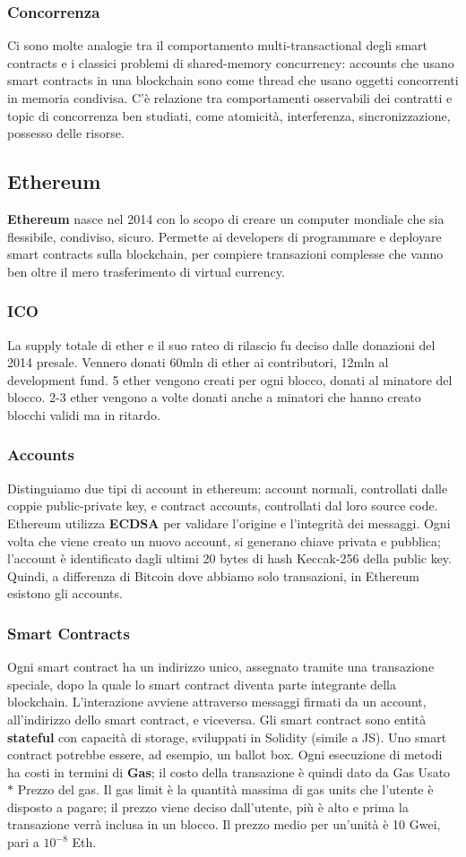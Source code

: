 \documentclass[11pt]{article}
\begin{document}
\subsubsection{Concorrenza}
Ci sono molte analogie tra il comportamento multi-transactional degli smart contracts e i classici problemi di shared-memory concurrency: accounts che usano smart contracts in una blockchain sono come thread che usano oggetti concorrenti in memoria condivisa. C'è relazione tra comportamenti osservabili dei contratti e topic di concorrenza ben studiati, come atomicità, interferenza, sincronizzazione, possesso delle risorse.

\subsection{Ethereum}
\textbf{Ethereum} nasce nel 2014 con lo scopo di creare un computer mondiale che sia flessibile, condiviso, sicuro. Permette ai developers di programmare e deployare smart contracts sulla blockchain, per compiere transazioni complesse che vanno ben oltre il mero trasferimento di virtual currency. 
\subsubsection{ICO} La supply totale di ether e il suo rateo di rilascio fu deciso dalle donazioni del 2014 presale. Vennero donati 60mln di ether ai contributori, 12mln al development fund. 5 ether vengono creati per ogni blocco, donati al minatore del blocco. 2-3 ether vengono a volte donati anche a minatori che hanno creato blocchi validi ma in ritardo. 
\subsubsection{Accounts} 
Distinguiamo due tipi di account in ethereum: account normali, controllati dalle coppie public-private key, e contract accounts, controllati dal loro source code. Ethereum utilizza \textbf{ECDSA} per validare l'origine e l'integrità dei messaggi. Ogni volta che viene creato un nuovo account, si generano chiave privata e pubblica; l'account è identificato dagli ultimi 20 bytes di hash Keccak-256 della public key. Quindi, a differenza di Bitcoin dove abbiamo solo transazioni, in Ethereum esistono gli accounts. 
\subsubsection{Smart Contracts} Ogni smart contract ha un indirizzo unico, assegnato tramite una transazione speciale, dopo la quale lo smart contract diventa parte integrante della blockchain. L'interazione avviene attraverso messaggi firmati da un account, all'indirizzo dello smart contract, e viceversa. Gli smart contract sono entità \textbf{stateful} con capacità di storage, sviluppati in Solidity (simile a JS). Uno smart contract potrebbe essere, ad esempio, un ballot box. Ogni esecuzione di metodi ha costi in termini di \textbf{Gas}; il costo della transazione è quindi dato da Gas Usato $*$ Prezzo del gas. Il gas limit è la quantità massima di gas units che l'utente è disposto a pagare; il prezzo viene deciso dall'utente, più è alto e prima la transazione verrà inclusa in un blocco. Il prezzo medio per un'unità è 10 Gwei, pari a $10^{-8}$ Eth. 
\end{document}

